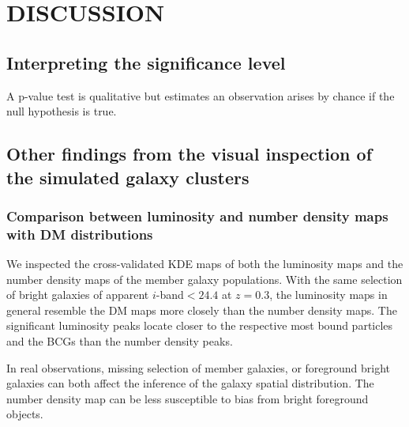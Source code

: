  
 
\section{DISCUSSION}\label{sec:discussion}


\subsection{Interpreting the significance level}
A p-value test is qualitative but estimates an observation
arises by chance if the null hypothesis is true.




% 
% 
% 






\subsection{Other findings from the visual inspection of the simulated galaxy clusters}
\subsubsection{Comparison between luminosity and number density maps with DM distributions}
We inspected the cross-validated KDE maps of both the luminosity maps and the
number density maps of the member galaxy populations.
With the same selection of bright galaxies of apparent $i$-band$ < 24.4$ at
$z=0.3$, the luminosity maps in general resemble the DM maps more closely than 
the number density maps. The significant luminosity peaks locate closer to
the respective most bound particles and the BCGs than the number density peaks. 

In real observations, missing selection of member galaxies, or 
foreground bright galaxies can both affect the inference of the galaxy spatial 
distribution. The number density map can be less susceptible to bias from bright 
foreground objects.



